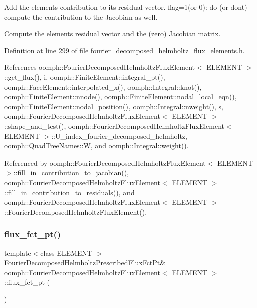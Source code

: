 Add the element\textquotesingle{}s contribution to its residual vector. flag=1(or 0)\+: do (or don\textquotesingle{}t) compute the contribution to the Jacobian as well. 

Compute the element\textquotesingle{}s residual vector and the (zero) Jacobian matrix. 

Definition at line 299 of file fourier\+\_\+decomposed\+\_\+helmholtz\+\_\+flux\+\_\+elements.\+h.



References oomph\+::\+Fourier\+Decomposed\+Helmholtz\+Flux\+Element$<$ E\+L\+E\+M\+E\+N\+T $>$\+::get\+\_\+flux(), i, oomph\+::\+Finite\+Element\+::integral\+\_\+pt(), oomph\+::\+Face\+Element\+::interpolated\+\_\+x(), oomph\+::\+Integral\+::knot(), oomph\+::\+Finite\+Element\+::nnode(), oomph\+::\+Finite\+Element\+::nodal\+\_\+local\+\_\+eqn(), oomph\+::\+Finite\+Element\+::nodal\+\_\+position(), oomph\+::\+Integral\+::nweight(), s, oomph\+::\+Fourier\+Decomposed\+Helmholtz\+Flux\+Element$<$ E\+L\+E\+M\+E\+N\+T $>$\+::shape\+\_\+and\+\_\+test(), oomph\+::\+Fourier\+Decomposed\+Helmholtz\+Flux\+Element$<$ E\+L\+E\+M\+E\+N\+T $>$\+::\+U\+\_\+index\+\_\+fourier\+\_\+decomposed\+\_\+helmholtz, oomph\+::\+Quad\+Tree\+Names\+::W, and oomph\+::\+Integral\+::weight().



Referenced by oomph\+::\+Fourier\+Decomposed\+Helmholtz\+Flux\+Element$<$ E\+L\+E\+M\+E\+N\+T $>$\+::fill\+\_\+in\+\_\+contribution\+\_\+to\+\_\+jacobian(), oomph\+::\+Fourier\+Decomposed\+Helmholtz\+Flux\+Element$<$ E\+L\+E\+M\+E\+N\+T $>$\+::fill\+\_\+in\+\_\+contribution\+\_\+to\+\_\+residuals(), and oomph\+::\+Fourier\+Decomposed\+Helmholtz\+Flux\+Element$<$ E\+L\+E\+M\+E\+N\+T $>$\+::\+Fourier\+Decomposed\+Helmholtz\+Flux\+Element().

\mbox{\label{classoomph_1_1FourierDecomposedHelmholtzFluxElement_aa1c688db1894035d70064dc9df74cdc8}} 
\subsubsection{\texorpdfstring{flux\+\_\+fct\+\_\+pt()}{flux\_fct\_pt()}}
{\footnotesize\ttfamily template$<$class E\+L\+E\+M\+E\+NT $>$ \\
\hyperlink{classoomph_1_1FourierDecomposedHelmholtzFluxElement_af230a2a3a16a1fd0a48a2681dc94c1e8}{Fourier\+Decomposed\+Helmholtz\+Prescribed\+Flux\+Fct\+Pt}\& \hyperlink{classoomph_1_1FourierDecomposedHelmholtzFluxElement}{oomph\+::\+Fourier\+Decomposed\+Helmholtz\+Flux\+Element}$<$ E\+L\+E\+M\+E\+NT $>$\+::flux\+\_\+fct\+\_\+pt (\begin{DoxyParamCaption}{ }\end{DoxyParamCaption})\hspace{0.3cm}{\ttfamily [inline]}}



